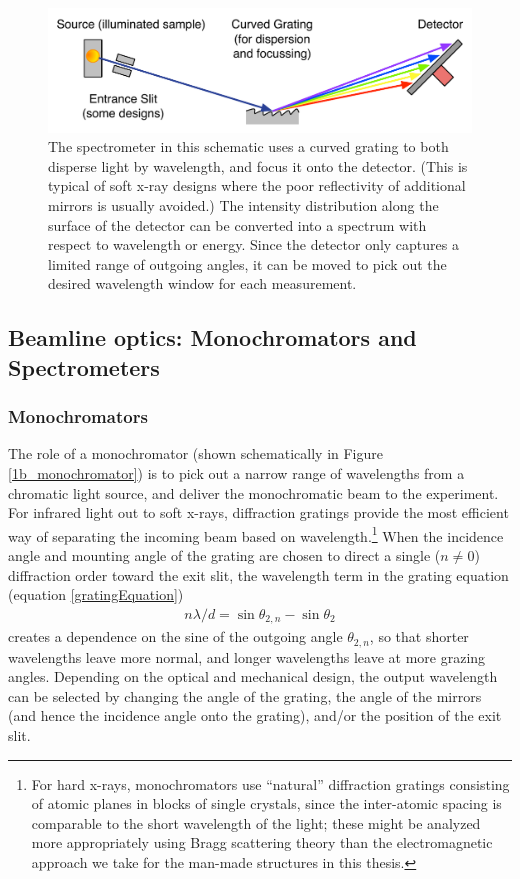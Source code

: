 \begin{figure}[htbp] %
   \centering
   \includegraphics[scale=0.6]{../data/Chapter1/1b_spectrometerSchematic/1b_rowlandSpectrometer.pdf} 
   \caption{The spectrometer in this schematic uses a curved grating to both disperse light by wavelength, and focus it onto the detector.  (This is typical of soft x-ray designs where the poor reflectivity of additional mirrors is usually avoided.)  The intensity distribution along the surface of the detector can be converted into a spectrum with respect to wavelength or energy.  Since the detector only captures a limited range of outgoing angles, it can be moved to pick out the desired wavelength window for each measurement.}
   \label{1b_rowlandSpectrometer}
\end{figure}





\subsection{Beamline optics: Monochromators and Spectrometers}
\subsubsection{Monochromators}
The role of a monochromator (shown schematically in Figure \ref{1b_monochromator}) is to pick out a narrow range of wavelengths from a chromatic light source, and deliver the monochromatic beam to the experiment.  For infrared light out to soft x-rays, diffraction gratings provide the most efficient way of separating the incoming beam based on wavelength.\footnote{For hard x-rays, monochromators use ``natural'' diffraction gratings consisting of atomic planes in blocks of single crystals, since the inter-atomic spacing is comparable to the short wavelength of the light; these might be analyzed more appropriately using Bragg scattering theory than the electromagnetic approach we take for the man-made structures in this thesis.}  When the incidence angle and mounting angle of the grating are chosen to direct a single ($n\neq0$) diffraction order toward the exit slit, the wavelength term in the grating equation (equation \ref{gratingEquation})
\begin{eqnarray*}
n\lambda / d = \sin\theta_{2,n} - \sin\theta_{2}
\end{eqnarray*}
creates a dependence on the sine of the outgoing angle $\theta_{2,n}$, so that shorter wavelengths leave more normal, and longer wavelengths leave at more grazing angles.  Depending on the optical and mechanical design, the output wavelength can be selected by changing the angle of the grating, the angle of the mirrors (and hence the incidence angle onto the grating), and/or the position of the exit slit.

